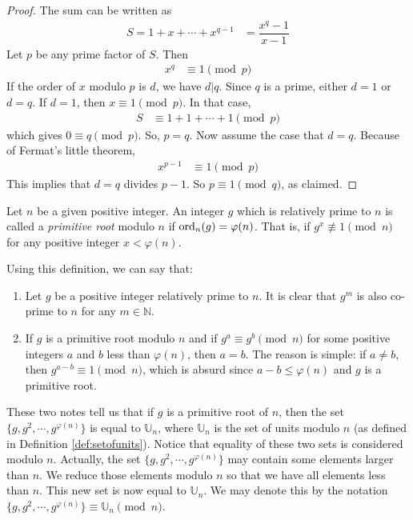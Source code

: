 \documentclass{subfile}
\begin{document}
	\begin{proof}
		The sum can be written as
			\begin{align*}
				S = 1+x+\cdots+x^{q-1} & = \dfrac{x^q-1}{x-1}
			\end{align*}
		Let $p$ be any prime factor of $S$. Then
			\begin{align*}
				x^q & \equiv1\pmod p
			\end{align*}
		If the order of $x$ modulo $p$ is $d$, we have $d|q$. Since $q$ is a prime, either $d=1$ or $d=q$. If $d=1$, then $x\equiv1\pmod p$. In that case,
			\begin{align*}
				S & \equiv 1+1+\cdots+1\pmod p
			\end{align*}
		which gives $0  \equiv q\pmod p$. So, $p=q$. Now assume the case that $d=q$. Because of Fermat's little theorem,
			\begin{align*}
				x^{p-1} & \equiv1\pmod p
			\end{align*}
		This implies that $d=q$ divides $p-1$. So $p\equiv1\pmod q$, as claimed.
	\end{proof}

	\begin{definition}
		Let $n$ be a given positive integer. An integer $g$ which is relatively prime to $n$  is called a \textit{primitive root} modulo $n$ if $\operatorname{ord}_n(g)=\varphi(n)$. That is, if $g^x\not\equiv1\pmod n$ for any positive integer $x<\varphi(n)$.
	\end{definition}

	\begin{note}
		Using this definition, we can say that:
			\begin{enumerate}
				\item Let $g$ be a positive integer relatively prime to $n$. It is clear that $g^m$ is also co-prime to $n$ for any $m \in \mathbb N$.
				\item If $g$ is a primitive root modulo $n$ and if $g^a \equiv g^b \pmod n$ for some positive integers $a$ and $b$ less than $\varphi(n)$, then $a=b$. The reason is simple: if $a \neq b$, then $g^{a-b} \equiv 1 \pmod n$, which is absurd since $a-b \leq \varphi(n)$ and $g$ is a primitive root.
			\end{enumerate}
	\end{note}

These two notes tell us that if $g$ is a primitive root of $n$, then the set $\{g,g^2,\cdots,g^{\varphi(n)}\}$ is equal to $\mathbb U_n$, where $\mathbb U_n$ is the set of units modulo $n$ (as defined in Definition \ref{def:setofunits}). Notice that equality of these two sets is considered modulo $n$. Actually, the set $\{g,g^2,\cdots,g^{\varphi(n)}\}$ may contain some elements larger than $n$. We reduce those elements modulo $n$ so that we have all elements less than $n$. This new set is now equal to $\mathbb U_n$. We may denote this by the notation $\{g,g^2,\cdots,g^{\varphi(n)}\} \equiv \mathbb U_n \pmod n$.
\end{document}

